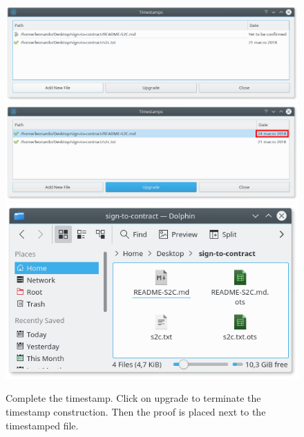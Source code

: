 \begin{figure}
	\begin{center}
		\includegraphics[width=\linewidth]{Images/pending-attestation.png}
		\includegraphics[width=\linewidth]{Images/post-upgrade.png}
		\includegraphics[width=0.7\linewidth]{Images/file-and-ots.png}
		\caption[Complete the timestamp.]{Complete the timestamp. Click on upgrade to terminate the timestamp construction. Then the proof is placed next to the timestamped file.}
		\label{fig:upgrade}
	\end{center}
\end{figure} 